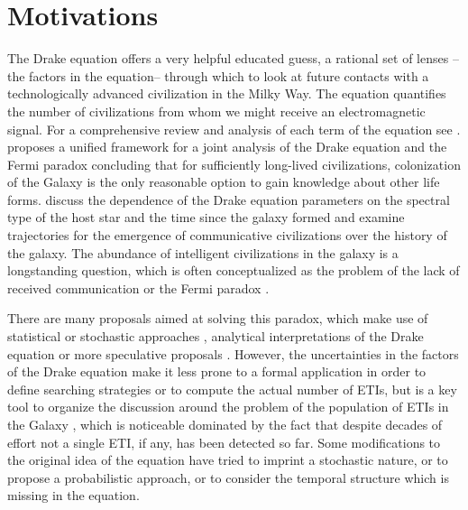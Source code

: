 \section{Motivations}\label{S_motivations}

The Drake equation \citep{drake_intelligent_1962}
offers a very helpful educated guess,
a rational set of lenses --the factors in the equation-- through which
to look at future contacts with a technologically advanced
civilization in the Milky Way.
%
The equation quantifies the number of
civilizations from whom we might receive an electromagnetic signal.
%
For a comprehensive review and analysis of each term of the equation
see \citet{vakoch_drake_2015}.
%
\citet{prantzos_joint_2013}
proposes a unified framework
for a joint analysis of the Drake equation and the Fermi paradox
concluding that for sufficiently long-lived civilizations,
colonization of the Galaxy is the only reasonable option to gain
knowledge about other life forms.
%
\citet{haqq-misra_drake_2017}
discuss the dependence of the Drake equation parameters on the
spectral type of the host star and the time since the galaxy formed
and examine trajectories for the emergence of communicative
civilizations over the history of the galaxy.
%
The abundance of
intelligent civilizations in the galaxy is a longstanding question,
which is often conceptualized as the problem of the lack of received
communication or the Fermi paradox 
\citep{barlow_galactic_2012, Sotos_biotechnology_2019,
forgan_galactic_2016}.



There are many proposals aimed at solving this paradox, which make use
of statistical \citep{solomonides_probabilistic_2016,
vanhouten_isthere_2017, horvat_calculating_2007,
maccone_statistical_2015} or stochastic approaches
\citep{forgan_numerical_2009, bloetscher_using_2019,
glade_stochastic_2011, forgan_numerical_2010}, analytical
interpretations of the Drake equation \citep{prantzos_joint_2013,
smith_broadcasting_2009} or more speculative proposals
\citep{barlow_galactic_2013, lampton_information_2013,
conway_three_2018, forgan_galactic_2017}.
%
%
However, the uncertainties in the factors of the Drake equation make
it less prone to a formal application in order to define searching
strategies or to compute the actual number of ETIs, but is a key tool
to organize the discussion around the problem of the population of
ETIs in the Galaxy \citep{hinkel_interdisciplinary_2019}, which is
noticeable dominated by the fact that despite decades of effort not a
single ETI, if any, has been detected so far.
%
Some modifications to the original idea of the equation have tried to
imprint a stochastic nature, or to propose a probabilistic approach,
or to consider the temporal structure which is missing in the
equation.


